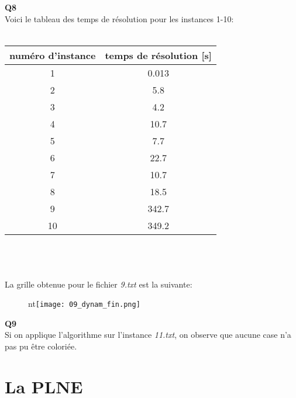 \documentclass[10pt,a4paper]{article}
\begin{document}
\noindent 
\textbf{Q8}
\\
\noindent
Voici le tableau des temps de résolution pour les instances 1-10: \\ \\
\begin{tabular}{|c|c|}
\hline
numéro d'instance & temps de résolution [s]\\
\hline
\hline
1  & 0.013\\
\hline
2 & 5.8\\
\hline
3 & 4.2\\
\hline
4 & 10.7\\
\hline
5 & 7.7\\
\hline
6 & 22.7\\
\hline
7 & 10.7\\
\hline
8 & 18.5\\
\hline
9 & 342.7\\
\hline
10 & 349.2\\
\hline
\end{tabular} 
\\ \\ \\
\newpage
\noindent
La grille obtenue pour le fichier \textit{9.txt} est la suivante:

\begin{figure}[H]
nt\texttt{[image: 09\_dynam\_fin.png]}
\end{figure} 
\noindent
\textbf{Q9} \\
\noindent
Si on applique l'algorithme sur l'instance \textit{11.txt}, on observe que aucune case n'a pas pu être coloriée. 
\newpage
\section{La PLNE}
\end{document}
